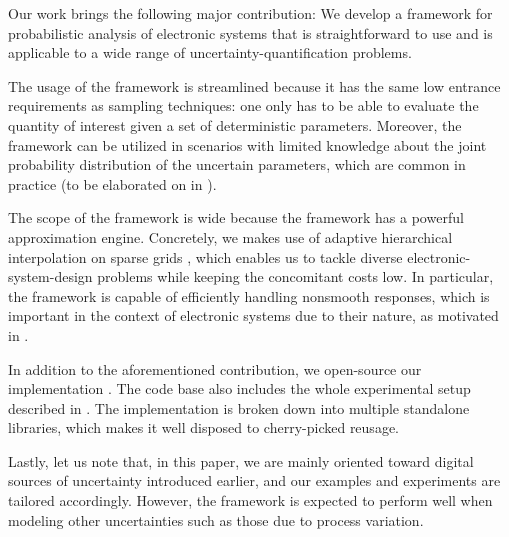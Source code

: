 Our work brings the following major contribution: We develop a framework for
probabilistic analysis of electronic systems that is straightforward to use and
is applicable to a wide range of uncertainty-quantification problems.

The usage of the framework is streamlined because it has the same low entrance
requirements as sampling techniques: one only has to be able to evaluate the
quantity of interest given a set of deterministic parameters. Moreover, the
framework can be utilized in scenarios with limited knowledge about the joint
probability distribution of the uncertain parameters, which are common in
practice (to be elaborated on in ).

The scope of the framework is wide because the framework has a powerful
approximation engine. Concretely, we makes use of adaptive hierarchical
interpolation on sparse grids \cite{jakeman2012, klimke2006, ma2009}, which
enables us to tackle diverse electronic-system-design problems while keeping the
concomitant costs low. In particular, the framework is capable of efficiently
handling nonsmooth responses, which is important in the context of electronic
systems due to their nature, as motivated in .

In addition to the aforementioned contribution, we open-source our
implementation \cite{sources}. The code base also includes the whole
experimental setup described in . The implementation is
broken down into multiple standalone libraries, which makes it well disposed to
cherry-picked reusage.

Lastly, let us note that, in this paper, we are mainly oriented toward digital
sources of uncertainty introduced earlier, and our examples and experiments are
tailored accordingly. However, the framework is expected to perform well when
modeling other uncertainties such as those due to process variation.
